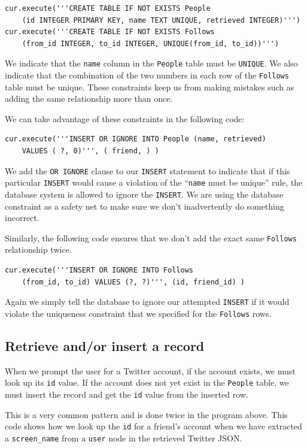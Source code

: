 \beforeverb
\begin{verbatim}
cur.execute('''CREATE TABLE IF NOT EXISTS People 
    (id INTEGER PRIMARY KEY, name TEXT UNIQUE, retrieved INTEGER)''')
cur.execute('''CREATE TABLE IF NOT EXISTS Follows 
    (from_id INTEGER, to_id INTEGER, UNIQUE(from_id, to_id))''')
\end{verbatim}
\afterverb
%
We indicate that the {\tt name} column in the {\tt People} table must be
{\tt UNIQUE}.   We also indicate that the combination of the two numbers
in each row of the {\tt Follows} table must be unique.  These constraints
keep us from making mistakes such as adding the same relationship more than
once.

We can take advantage of these constraints in the following code:

\beforeverb
\begin{verbatim}
cur.execute('''INSERT OR IGNORE INTO People (name, retrieved) 
    VALUES ( ?, 0)''', ( friend, ) )
\end{verbatim}
\afterverb
%
We add the {\tt OR IGNORE} clause to our {\tt INSERT} statement to indicate
that if this particular {\tt INSERT} would cause a violation of the
``{\tt name} must be unique'' rule, the database system is allowed to ignore the 
{\tt INSERT}.  We are using the database constraint as a safety net
to make sure we don't inadvertently do something incorrect.

Similarly, the following code ensures that we don't add the 
exact same {\tt Follows} relationship twice.

\beforeverb
\begin{verbatim}
cur.execute('''INSERT OR IGNORE INTO Follows 
    (from_id, to_id) VALUES (?, ?)''', (id, friend_id) )
\end{verbatim}
\afterverb
%
Again we simply tell the database to ignore our attempted 
{\tt INSERT} if it would violate the uniqueness constraint
that we specified for the {\tt Follows} rows.

\subsection{Retrieve and/or insert a record}

When we prompt the user for a Twitter account, if the account 
exists, we must look up its {\tt id} value.  If the account
does not yet exist in the {\tt People} table, we must insert 
the record and get the {\tt id} value from the inserted
row.

This is a very common pattern and is done twice in the program above.
This code shows how we look up the {\tt id} for a 
friend's account when we have extracted a \verb"screen_name"
from a {\tt user} node in the retrieved Twitter JSON.

